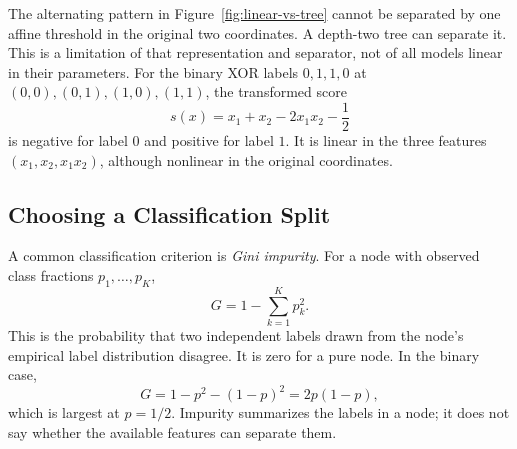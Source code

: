 \par\addvspace{\intextsep}\noindent\begin{minipage}{\linewidth}
\centering
{}
\label{fig:linear-vs-tree}
\end{minipage}\par\addvspace{\intextsep}

The alternating pattern in Figure~\ref{fig:linear-vs-tree} cannot be separated by one affine threshold in the original two coordinates. A depth-two tree can separate it. This is a limitation of that representation and separator, not of all models linear in their parameters. For the binary XOR labels $0,1,1,0$ at $(0,0),(0,1),(1,0),(1,1)$, the transformed score
\[
s(x)=x_1+x_2-2x_1x_2-\frac12
\]
is negative for label $0$ and positive for label $1$. It is linear in the three features $(x_1,x_2,x_1x_2)$, although nonlinear in the original coordinates.

\subsection{Choosing a Classification Split}

A common classification criterion is \emph{Gini impurity}. For a node with observed class fractions $p_1,\ldots,p_K$,
\[
G=1-\sum_{k=1}^K p_k^2.
\]
This is the probability that two independent labels drawn from the node's empirical label distribution disagree. It is zero for a pure node. In the binary case,
\[
G=1-p^2-(1-p)^2=2p(1-p),
\]
which is largest at $p=1/2$. Impurity summarizes the labels in a node; it does not say whether the available features can separate them.

